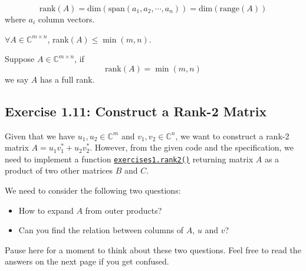 \begin{definition}
  \[
  \text{rank}(A) = \text{dim}(\text{span}(a_1, a_2, \cdots, a_n)) = \text{dim}(\text{range}(A))
\]
where \(a_i\)  column vectors. 
\end{definition}
\begin{property}
  \(\forall A \in \mathbb{C}^{m \times n}\), rank\((A) \leq \min(m, n)\).
\end{property}
\begin{definition}
  Suppose \(A \in \mathbb{C}^{m \times n}\), if 
  \[
    \text{rank}(A) = \min(m, n)
  \]
  we say \(A\) has a full rank. \checked
\end{definition}

\subsection*{Exercise 1.11: Construct a Rank-2 Matrix}%
\begin{problem}
  Given that we have $u_1, u_2 \in \mathbb{C}^{m}$ and $v_1, v_2 \in \mathbb{C}^{n}$, we want to construct a rank-2 matrix $A = u_1v_1^{*} + u_2v_2^{*}$. However, from the given code and the specification, we need to implement a function \href{https://comp-lin-alg.github.io/cla_utils.html#cla_utils.exercises1.rank2}{\texttt{exercises1.rank2()}} returning matrix  $A$ as a product of two other matrices $B$ and $C$.
\end{problem}
\begin{hint}
  We need to consider the following two questions:
\end{hint}
\begin{itemize}
  \item How to expand $A$ from outer products?
  \item Can you find the relation between columns of \(A\), \(u\) and \(v\)?
\end{itemize}
Pause here for a moment to think about these two questions. Feel free to read the answers on the next page if you get confused.
\newpage

